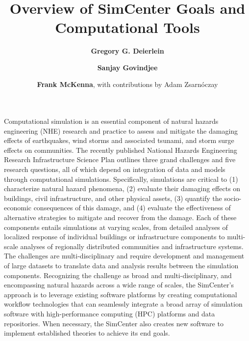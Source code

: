 %
%
%

\title{Overview of SimCenter Goals and Computational Tools}
\author{
    \textbf{Gregory G. Deierlein}
    \and \textbf{Sanjay Govindjee}
    \and \textbf{Frank McKenna},
    with contributions by Adam Zsarnóczay
}
\tocauthor{}
%
%
\maketitle
\label{chapter:intro}

Computational simulation is an essential component of natural hazards engineering (NHE) research and practice to assess and mitigate the damaging effects of earthquakes, wind storms and associated tsunami, and storm surge effects on communities. The recently published National Hazards Engineering Research Infrastructure Science Plan \citep{edge2020natural} outlines three grand challenges and five research questions, all of which depend on integration of data and models through computational simulations.  Specifically, simulations are critical to (1) characterize natural hazard phenomena, (2) evaluate their damaging effects on buildings, civil infrastructure, and other physical assets, (3) quantify the socio-economic consequences of this damage, and (4) evaluate the effectiveness of alternative strategies to mitigate and recover from the damage.  Each of these components entails simulations at varying scales, from detailed analyses of localized response of individual buildings or infrastructure components to multi-scale analyses of regionally distributed communities and infrastructure systems.  The challenges are multi-disciplinary and require development and management of large datasets to translate data and analysis results between the simulation components. Recognizing the challenge as broad and multi-disciplinary, and encompassing natural hazards across a wide range of scales, the SimCenter’s approach is to leverage existing software platforms by creating computational workflow technologies that can seamlessly integrate a broad array of simulation software with high-performance computing (HPC) platforms and data repositories. When necessary, the SimCenter also creates new software to implement established theories to achieve its end goals.

